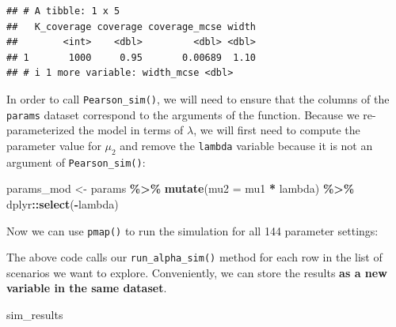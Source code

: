 \documentclass[
]{book}
\newenvironment{Shaded}{\begin{snugshade}}{\end{snugshade}}
\newcommand{\AttributeTok}[1]{\textcolor[rgb]{0.13,0.29,0.53}{#1}}
\newcommand{\DecValTok}[1]{\textcolor[rgb]{0.00,0.00,0.81}{#1}}
\newcommand{\FunctionTok}[1]{\textcolor[rgb]{0.13,0.29,0.53}{\textbf{#1}}}
\newcommand{\NormalTok}[1]{#1}
\newcommand{\OtherTok}[1]{\textcolor[rgb]{0.56,0.35,0.01}{#1}}
\newcommand{\SpecialCharTok}[1]{\textcolor[rgb]{0.81,0.36,0.00}{\textbf{#1}}}
\begin{document}
\begin{verbatim}
## # A tibble: 1 x 5
##   K_coverage coverage coverage_mcse width
##        <int>    <dbl>         <dbl> <dbl>
## 1       1000     0.95       0.00689  1.10
## # i 1 more variable: width_mcse <dbl>
\end{verbatim}

In order to call \texttt{Pearson\_sim()}, we will need to ensure that the columns of the \texttt{params} dataset correspond to the arguments of the function.
Because we re-parameterized the model in terms of \(\lambda\), we will first need to compute the parameter value for \(\mu_2\) and remove the \texttt{lambda} variable because it is not an argument of \texttt{Pearson\_sim()}:

\begin{Shaded}
\begin{Highlighting}[]
\NormalTok{params\_mod }\OtherTok{\textless{}{-}} 
\NormalTok{  params }\SpecialCharTok{\%\textgreater{}\%}
  \FunctionTok{mutate}\NormalTok{(}\AttributeTok{mu2 =}\NormalTok{ mu1 }\SpecialCharTok{*}\NormalTok{ lambda) }\SpecialCharTok{\%\textgreater{}\%}
\NormalTok{  dplyr}\SpecialCharTok{::}\FunctionTok{select}\NormalTok{(}\SpecialCharTok{{-}}\NormalTok{lambda)}
\end{Highlighting}
\end{Shaded}

Now we can use \texttt{pmap()} to run the simulation for all 144 parameter settings:

\begin{Shaded}
\end{Shaded}

The above code calls our \texttt{run\_alpha\_sim()} method for each row in the list of scenarios we want to explore.
Conveniently, we can store the results \textbf{as a new variable in the same dataset}.

\begin{Shaded}
\begin{Highlighting}[]
\NormalTok{sim\_results}
\end{Highlighting}
\end{Shaded}
\end{document}
